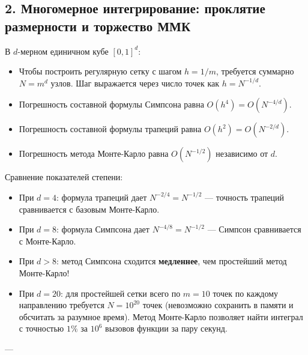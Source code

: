 \documentclass[11pt,a4paper]{article}
\begin{document}
\subsection{2. Многомерное интегрирование: проклятие размерности и торжество ММК}
В $d$-мерном единичном кубе $[0,1]^d$:
\begin{itemize}
    \item Чтобы построить регулярную сетку с шагом $h = 1/m$, требуется суммарно $N = m^d$ узлов. Шаг выражается через число точек как $h = N^{-1/d}$.
    \item Погрешность составной формулы Симпсона равна $O(h^4) = O(N^{-4/d})$.
    \item Погрешность составной формулы трапеций равна $O(h^2) = O(N^{-2/d})$.
    \item Погрешность метода Монте-Карло равна $O(N^{-1/2})$ независимо от $d$.
\end{itemize}

Сравнение показателей степени:
\begin{itemize}
    \item При $d = 4$: формула трапеций дает $N^{-2/4} = N^{-1/2}$ --- точность трапеций сравнивается с базовым Монте-Карло.
    \item При $d = 8$: формула Симпсона дает $N^{-4/8} = N^{-1/2}$ --- Симпсон сравнивается с Монте-Карло.
    \item При $d > 8$: метод Симпсона сходится \textbf{медленнее}, чем простейший метод Монте-Карло!
    \item При $d = 20$: для простейшей сетки всего по $m = 10$ точек по каждому направлению требуется $N = 10^{20}$ точек (невозможно сохранить в памяти и обсчитать за разумное время). Метод Монте-Карло позволяет найти интеграл с точностью $1\%$ за $10^6$ вызовов функции за пару секунд.
\end{itemize}

---
\end{document}
